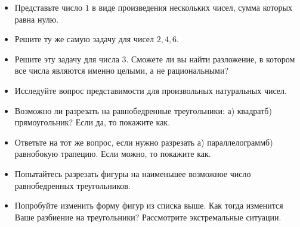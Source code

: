 
\begin{itemize}
\item Представьте число $1$ в виде произведения нескольких чисел, сумма которых равна нулю.
\item Решите ту же самую задачу для чисел $2,4,6$.
\item Решите эту задачу для числа $3$. Сможете ли вы найти разложение, в котором все числа являются именно целыми, а не рациональными?
\item Исследуйте вопрос представимости для произвольных натуральных чисел.
\end{itemize}


\begin{itemize}
\item Возможно ли разрезать на равнобедренные треугольники: а) квадрат\scolon б) прямоугольник? Если да, то покажите как.
\item Ответьте на тот же вопрос, если нужно разрезать а) параллелограмм\scolon б) равнобокую трапецию. Если можно, то покажите как.
\item Попытайтесь разрезать фигуры на наименьшее возможное число равнобедренных треугольников.
\item Попробуйте изменить форму фигур из списка выше. Как тогда изменится Ваше разбиение на треугольники? Рассмотрите экстремальные ситуации.
\end{itemize}